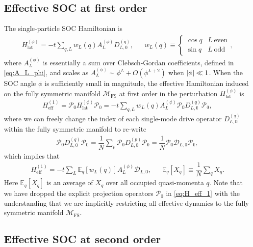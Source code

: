 \documentclass[nofootinbib,notitlepage,11pt]{revtex4-2}
\renewcommand{\t}{\text} %
\newcommand{\f}[2]{\dfrac{#1}{#2}} %
\newcommand{\p}[1]{\left(#1\right)} %
\renewcommand{\sp}[1]{\left[#1\right]} %
\newcommand{\1}{\mathds{1}}
\newcommand{\D}{\mathcal{D}}
\newcommand{\M}{\mathcal{M}}
\renewcommand{\P}{\mathcal{P}}
\newcommand{\EE}{\mathbb{E}}
\newcommand{\FS}{\text{FS}}
\begin{document}
\subsection{Effective SOC at first order}
\label{sec:H_eff_1}

The single-particle SOC Hamiltonian is
\begin{align}
  H_{\t{lat}}^{(\phi)}
  = -t \sum_{q,L} w_L\p{q} A_L^{(\phi)} D_{L,0}^{(q)},
  &&
  w_L\p{q} \equiv
  \begin{cases}
    \cos q & L~\t{even} \\
    \sin q & L~\t{odd}
  \end{cases},
  \label{eq:H_lat_SOC_A}
\end{align}
where $A_L^{(\phi)}$ is essentially a sum over Clebsch-Gordan
coefficients, defined in \eqref{eq:A_L_phi}, and scales as
$A_L^{(\phi)} \sim \phi^L + O\p{\phi^{L+2}}$ when $\abs{\phi}\ll1$.
When the SOC angle $\phi$ is sufficiently small in magnitude, the
effective Hamiltonian induced on the fully symmetric manifold $\M_\FS$
at first order in the perturbation $H_{\t{lat}}^{(\phi)}$ is
\begin{align}
  H_{\t{eff}}^{(1)}
  = \P_0 H_{\t{lat}}^{(\phi)} \P_0
  = -t \sum_{q,L} w_L\p{q} A_L^{(\phi)} \P_0 D_{L,0}^{(q)} \P_0,
\end{align}
where we can freely change the index of each single-mode drive
operator $D_{L,0}^{(q)}$ within the fully symmetric manifold to
re-write
\begin{align}
  \P_0 D_{L,0}^{(q)} \P_0 = \f1N \sum_p \P_0 D_{L,0}^{(p)} \P_0
  = \f1N \P_0 \D_{L,0} \P_0,
\end{align}
which implies that
\begin{align}
  H_{\t{eff}}^{(1)}
  = -t \sum_L \EE_q\sp{w_L\p{q}} A_L^{(\phi)} \D_{L,0},
  &&
  \EE_q\sp{X_q} \equiv \f1N \sum_q X_q.
  \label{eq:H_eff_1}
\end{align}
Here $\EE_q\sp{X_q}$ is an average of $X_q$ over all occupied
quasi-momenta $q$.  Note that we have dropped the explicit projection
operators $\P_0$ in \eqref{eq:H_eff_1} with the understanding that we
are implicitly restricting all effective dynamics to the fully
symmetric manifold $\M_\FS$.

\subsection{Effective SOC at second order}
\label{sec:H_eff_2}
\end{document}
